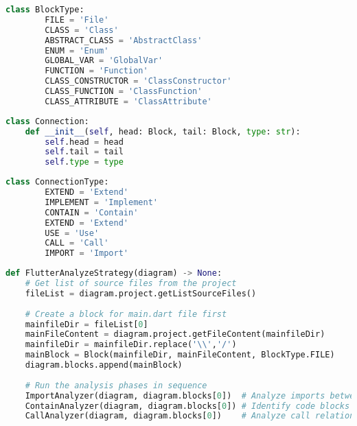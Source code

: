 \begin{lstlisting}[language=Python, caption={$\texttt{BlockType}$ class (Enumerate).}, label={lst:5}]
    class BlockType:
        FILE = 'File'
        CLASS = 'Class'
        ABSTRACT_CLASS = 'AbstractClass'
        ENUM = 'Enum'
        GLOBAL_VAR = 'GlobalVar'
        FUNCTION = 'Function'
        CLASS_CONSTRUCTOR = 'ClassConstructor'
        CLASS_FUNCTION = 'ClassFunction'
        CLASS_ATTRIBUTE = 'ClassAttribute'
\end{lstlisting}

\begin{lstlisting}[language=Python, caption={$\texttt{Connection}$ class.}, label={lst:6}]
    class Connection:
    def __init__(self, head: Block, tail: Block, type: str):
        self.head = head
        self.tail = tail
        self.type = type
\end{lstlisting}

\begin{lstlisting}[language=Python, caption={$\texttt{ConnectionType}$ class (Enumerate).}, label={lst:7}]
    class ConnectionType:
        EXTEND = 'Extend'
        IMPLEMENT = 'Implement'
        CONTAIN = 'Contain'
        EXTEND = 'Extend'
        USE = 'Use'
        CALL = 'Call'
        IMPORT = 'Import'
\end{lstlisting}
 
\begin{lstlisting}[language=Python, caption={$\texttt{FlutterAnalyzeStrategy}$ function.}, label={lst:8}]
    def FlutterAnalyzeStrategy(diagram) -> None:
    # Get list of source files from the project
    fileList = diagram.project.getListSourceFiles()
    
    # Create a block for main.dart file first
    mainfileDir = fileList[0]
    mainFileContent = diagram.project.getFileContent(mainfileDir)
    mainfileDir = mainfileDir.replace('\\','/')
    mainBlock = Block(mainfileDir, mainFileContent, BlockType.FILE)
    diagram.blocks.append(mainBlock)
    
    # Run the analysis phases in sequence
    ImportAnalyzer(diagram, diagram.blocks[0])  # Analyze imports between files
    ContainAnalyzer(diagram, diagram.blocks[0]) # Identify code blocks and containment
    CallAnalyzer(diagram, diagram.blocks[0])    # Analyze call relationships
\end{lstlisting}

